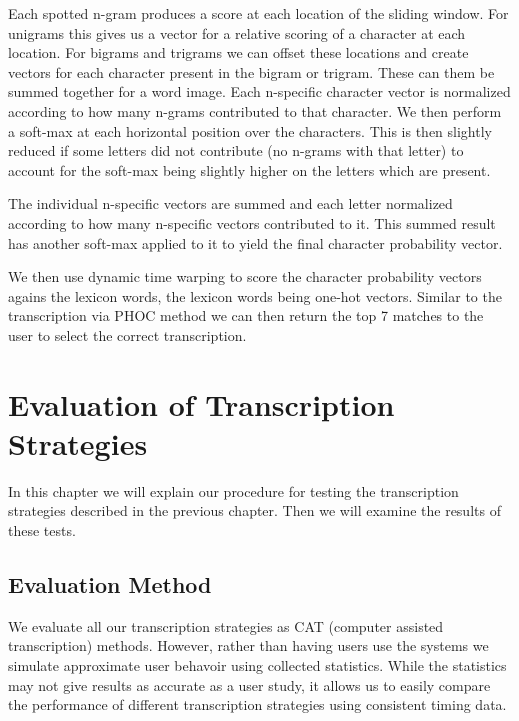 \documentclass[ms,electronic,twosidetoc,letterpaper,chaptercenter,parttop,lof,lot]{byumsphd}
\begin{document}
Each spotted n-gram produces a score at each location of the sliding window. For unigrams this gives us a vector for a relative scoring of a character at each location. For bigrams and trigrams we can offset these locations and create vectors for each character present in the bigram or trigram. These can them be summed together for a word image.
Each n-specific character vector is normalized according to how many n-grams contributed to that character.
We then perform a soft-max at each horizontal position over the characters. This is then slightly reduced if some letters did not contribute (no n-grams with that letter) to account for the soft-max being slightly higher on the letters which are present.

The individual n-specific vectors are summed and each letter normalized according to how many n-specific vectors contributed to it.
This summed result has another soft-max applied to it to yield the final character probability vector.

We then use dynamic time warping to score the character probability vectors agains the lexicon words, the lexicon words being one-hot vectors. Similar to the transcription via PHOC method we can then return the top 7 matches to the user to select the correct transcription.




\chapter{Evaluation of Transcription Strategies}

In this chapter we will explain our procedure for testing the transcription strategies described in the previous chapter. Then we will examine the results of these tests.

\section{Evaluation Method}

We evaluate all our transcription strategies as CAT (computer assisted transcription) methods. However, rather than having users use the systems we simulate approximate user behavoir using collected statistics. While the statistics may not give results as accurate as a user study, it allows us to easily compare the performance of different transcription strategies using consistent timing data.
\end{document}
